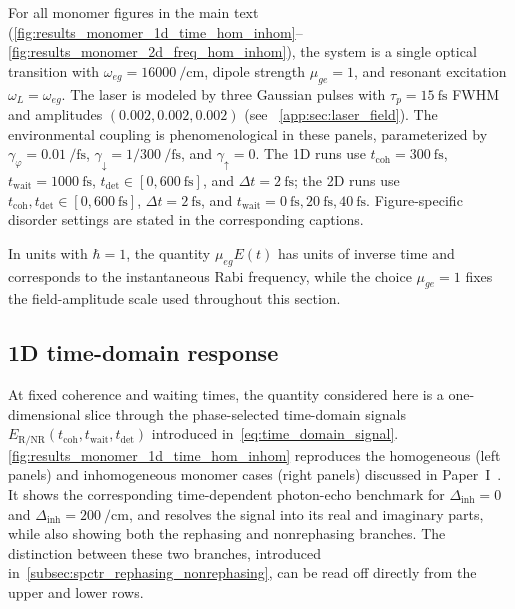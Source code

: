 For all monomer figures in the main text (\autoref{fig:results_monomer_1d_time_hom_inhom}--\autoref{fig:results_monomer_2d_freq_hom_inhom}), the system is a single optical transition with $\omega_{eg}=\SI{16000}{\per\centi\metre}$, dipole strength $\mu_{ge}=1$, and resonant excitation $\omega_L=\omega_{eg}$. The laser is modeled by three Gaussian pulses with $\tau_p = \SI{15}{\femto\second}$ FWHM and amplitudes $(0.002,0.002,0.002)$ (see ~\autoref{app:sec:laser_field}). The environmental coupling is phenomenological in these panels, parameterized by $\gamma_{\varphi}=0.01~\si{\per\femto\second}$, $\gamma_{\downarrow}=1/300~\si{\per\femto\second}$, and $\gamma_{\uparrow}=0$. The 1D runs use $t_{\mathrm{coh}}=\SI{300}{\femto\second}$, $t_{\mathrm{wait}}=\SI{1000}{\femto\second}$, $t_{\mathrm{det}}\in[0,\SI{600}{\femto\second}]$, and $\Delta t=\SI{2}{\femto\second}$; the 2D runs use $t_{\mathrm{coh}},t_{\mathrm{det}}\in[0,\SI{600}{\femto\second}]$, $\Delta t=\SI{2}{\femto\second}$, and $t_{\mathrm{wait}}=\SI{0}{\femto\second},\SI{20}{\femto\second},\SI{40}{\femto\second}$. Figure-specific disorder settings are stated in the corresponding captions.

In units with $\hbar=1$, the quantity $\mu_{eg}E(t)$ has units of inverse time and corresponds to the instantaneous Rabi frequency, while the choice $\mu_{ge}=1$ fixes the field-amplitude scale used throughout this section.

\subsection{1D time-domain response}
\label{subsec:results_monomer_1d_time}

At fixed coherence and waiting times, the quantity considered here is a one-dimensional slice through the phase-selected time-domain signals
$E_{\mathrm{R/NR}}(t_{\mathrm{coh}},t_{\mathrm{wait}},t_{\mathrm{det}})$ introduced in~\autoref{eq:time_domain_signal}.
\autoref{fig:results_monomer_1d_time_hom_inhom} reproduces the homogeneous (left panels) and inhomogeneous monomer cases (right panels) discussed in Paper~I~\cite{mancaletal2006twodimensionalopticalthreepulse}. It shows the corresponding time-dependent photon-echo benchmark for $\Delta_{\mathrm{inh}}=0$ and $\Delta_{\mathrm{inh}}=\SI{200}{\per\centi\metre}$, and resolves the signal into its real and imaginary parts, while also showing both the rephasing and nonrephasing branches. The distinction between these two branches, introduced in~\autoref{subsec:spctr_rephasing_nonrephasing}, can be read off directly from the upper and lower rows.

